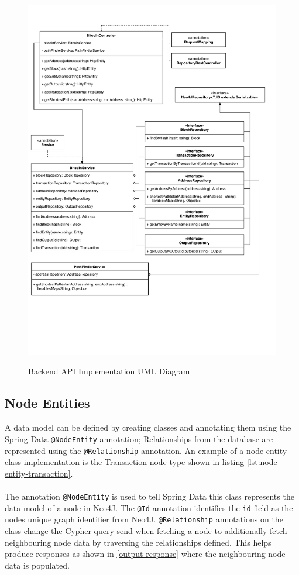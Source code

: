 \begin{figure}
  \centering
  \includegraphics[width = 15cm]{./figures/backend-uml.pdf}\\[0.5cm] 
  \caption{Backend API Implementation UML Diagram}
  \label{fig:backend-uml}
\end{figure} 

\subsection{Node Entities}
A data model can be defined by creating classes and annotating them using the Spring Data \texttt{@NodeEntity} annotation; Relationships from the database are represented using the \texttt{@Relationship} annotation. An example of a node entity class implementation is the Transaction node type shown in listing \ref{lst:node-entity-transaction}.
\\\\
The annotation \texttt{@NodeEntity} is used to tell Spring Data this class represents the data model of a node in Neo4J. The \texttt{@Id} annotation identifies the \texttt{id} field as the nodes unique graph identifier from Neo4J. \texttt{@Relationship} annotations on the class change the Cypher query send when fetching a node to additionally fetch neighbouring node data by traversing the relationships defined. This helps produce responses as shown in \ref{output-response} where the neighbouring node data is populated. 

